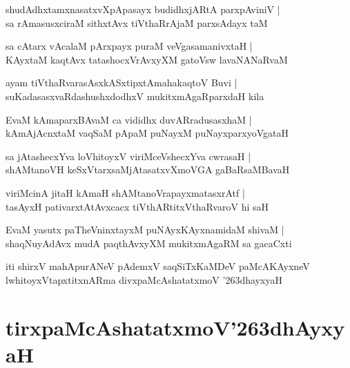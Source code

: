 \documentclass[twoside,12pt,openright]{book}
\def\S{\char'263}
\newcounter{shloka}[chapter]
\begin{document}
\begin{shloka}%
shudAdhxtamxnasatxvXpApasayx budidhxjARtA parxpAviniV |\\
sa rAmasusxciraM sithxtAvx tiVthaRrAjaM parxsAdayx taM 
\end{shloka}

\begin{shloka}%
sa cAtarx vAcalaM pArxpayx puraM veVgasamanivxtaH |\\
KAyxtaM kaqtAvx tatashocxVrAvxyXM gatoVsw lavaNANaRvaM 
\end{shloka}

\begin{shloka}%
ayam tiVthaRvarasAsxkASxtipxtAmahakaqtoV Buvi |\\
suKadasasxvaRdashushxdodhxV mukitxmAgaRparxdaH kila
\end{shloka}

\begin{shloka}%
EvaM kAmaparxBAvaM ca vididhx duvARradusasxhaM |\\
kAmAjAcnxtaM vaqSaM pApaM puNayxM puNayxparxyoVgataH 
\end{shloka}

\begin{shloka}%
sa jAtashecxYva loVhitoyxV viriMceVshecxYva cwrasaH |\\
shAMtanoVH keSxVtarxsaMjAtasatxvXmoVGA gaBaRsaMBavaH 
\end{shloka}

\begin{shloka}%
viriMcinA jitaH kAmaH shAMtanoVrapayxmatasxrAtf |\\
tasAyxH pativarxtAtAvxcacx tiVthARtitxVthaRvaroV hi saH 
\end{shloka}

\begin{shloka}%
EvaM yasutx paTheVninxtayxM puNAyxKAyxnamidaM shivaM |\\
shaqNuyAdAvx mudA paqthAvxyXM mukitxmAgaRM sa gacaCxti
\end{shloka}

\begin{center}
iti shirxV mahApurANeV pAdemxV saqSiTxKaMDeV paMcAKAyxneV lwhitoyxVtapxtitxnARma divxpaMcAshatatxmoV
\S dhayxyaH
\end{center}

\chapter{tirxpaMcAshatatxmoV\S dhAyxyaH}
\end{document}
